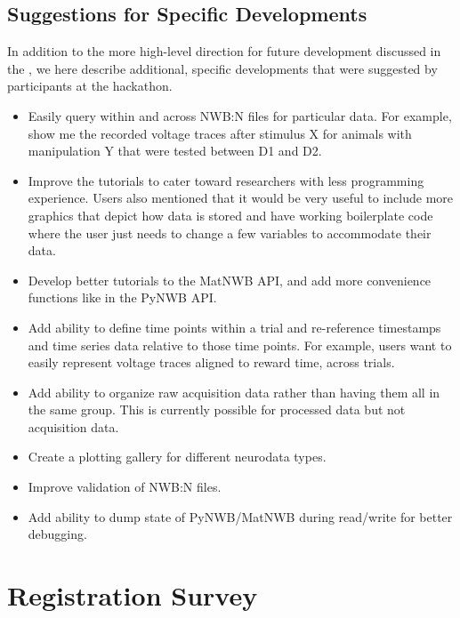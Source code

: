 \documentclass{article}
\begin{document}
\subsection{Suggestions for Specific Developments}
\label{sec:es:dev}

In addition to the more high-level direction for future development discussed in the , we here describe additional, specific developments that were suggested by participants at the hackathon. 

\begin{itemize}
 \setlength\itemsep{0cm}
 \item Easily query within and across NWB:N files for particular data. For example, show me the recorded voltage traces after stimulus X for animals with manipulation Y that were tested between D1 and D2.
 \item Improve the tutorials to cater toward researchers with less programming experience. Users also mentioned that it would be very useful to include more graphics that depict how data is stored and have working boilerplate code where the user just needs to change a few variables to accommodate their data. 
 \item Develop better tutorials to the MatNWB API, and add more convenience functions like in the PyNWB API.
 \item Add ability to define time points within a trial and re-reference timestamps and time series data relative to those time points. For example, users want to easily represent voltage traces aligned to reward time, across trials.
 \item Add ability to organize raw acquisition data rather than having them all in the same group. This is currently possible for processed data but not acquisition data.
 \item Create a plotting gallery for different neurodata types.
 \item Improve validation of NWB:N files.  
 \item Add ability to dump state of PyNWB/MatNWB during read/write for better debugging.
\end{itemize}


\clearpage
\section{Registration Survey}
\label{sec:regsurv}
\end{document}

